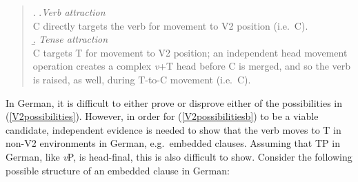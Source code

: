 \singlespacing
\begin{quote}
\begin{minipage}{5in}
\ex. \label{V2possibilities}
\a.\textit{Verb attraction} \label{V2possibilitiesa}\\
C directly targets the verb for movement to V2 position (i.e.\ C\raisebox{-3pt}{\footnotesize{[{\it -v}]}}).\footnotemark\\ 
\b. \textit{Tense attraction} \label{V2possibilitiesb}\\
C targets T for movement to V2 position; an independent head movement operation creates a complex \textit{v}+T head before C is merged, and so the verb is raised, as well, during T-to-C movement (i.e.\ C\raisebox{-3pt}{\footnotesize{[-T]}}).\\

\end{minipage}
\end{quote}
\onehalfspacing
In German, it is difficult to either prove or disprove either of the possibilities in (\ref{V2possibilities}). However, in order for (\ref{V2possibilitiesb}) to be a viable candidate, independent evidence is needed to show that the verb moves to T in non-V2 environments in German, e.g.\ embedded clauses. Assuming that TP in German, like \textit{v}P, is head-final, this is also difficult to show. Consider the following possible structure of an embedded clause in German:

